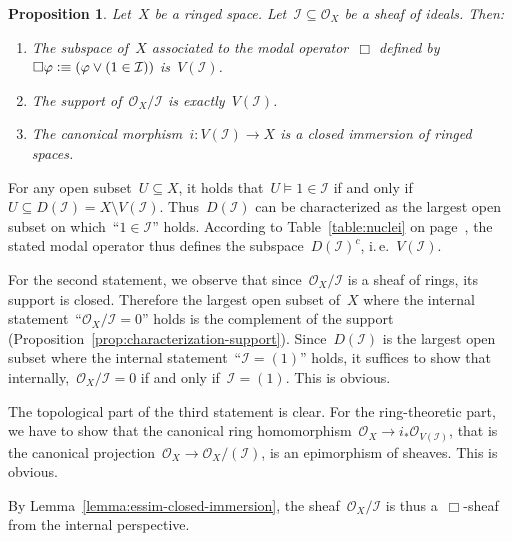 \documentclass[10pt,reqno,a4paper]{amsbook}
\makeatletter
\theoremstyle{definition}
\theoremstyle{plain}
\newtheorem{prop}[defn]{Proposition}
\theoremstyle{remark}
\renewcommand{\O}{\mathcal{O}}
\newcommand{\I}{\mathcal{I}}
\newcommand{\?}{\,{:}\,}
\renewcommand{\_}{\mathpunct{.}\,}
\newcommand{\ie}{i.\,e.\@\xspace}
\newcommand{\defequiv}{\vcentcolon\equiv}
\renewenvironment{proof}[1][\proofname]{\par
  \pushQED{\qed}%
  \normalfont \topsep6\p@\@plus6\p@\relax
  \trivlist
  \item[\hskip\labelsep
        \itshape
    #1\@addpunct{.}]\ignorespaces
}{%
  \popQED\endtrivlist\@endpefalse
}
\makeatother
\begin{document}
\begin{prop}\label{prop:basics-closed-subspace}
Let~$X$ be a ringed space. Let~$\I \subseteq \O_X$ be a sheaf of ideals.
Then:
\begin{enumerate}
\item The subspace of~$X$ associated to the modal operator~$\Box$ defined
by~$\Box\varphi \defequiv (\varphi \vee (1 \in \I))$ is~$V(\I)$.
\item The support of~$\O_X/\I$ is exactly~$V(\I)$.
\item The canonical morphism~$i : V(\I) \to X$ is a closed immersion
of ringed spaces.
\end{enumerate}\end{prop}
\begin{proof}For any open subset~$U \subseteq X$, it holds that~$U \models 1
\in \I$ if and only if~$U \subseteq D(\I) = X \setminus V(\I)$. Thus~$D(\I)$
can be characterized as the largest open subset on which~``$1 \in \I$'' holds.
According to Table~\ref{table:nuclei} on page~\pageref{table:nuclei}, the
stated modal operator thus defines the subspace~$D(\I)^c$, \ie~$V(\I)$.

For the second statement, we observe that since~$\O_X/\I$ is a sheaf of rings, its
support is closed. Therefore the largest open subset of~$X$ where the internal
statement~``$\O_X/\I = 0$'' holds is the complement of the support
(Proposition~\ref{prop:characterization-support}). Since~$D(\I)$ is the largest
open subset where the internal statement~``$\I = (1)$'' holds, it suffices to
show that internally,~$\O_X/\I = 0$ if and only if~$\I = (1)$. This is obvious.

The topological part of the third statement is clear. For the ring-theoretic
part, we have to show that the canonical ring homomorphism~$\O_X \to i_*
\O_{V(\I)}$, that is the canonical projection~$\O_X \to \O_X/(\I)$, is an
epimorphism of sheaves. This is obvious.
\end{proof}

By Lemma~\ref{lemma:essim-closed-immersion}, the sheaf~$\O_X/\I$ is
thus a~$\Box$-sheaf from the internal perspective.
\end{document}
